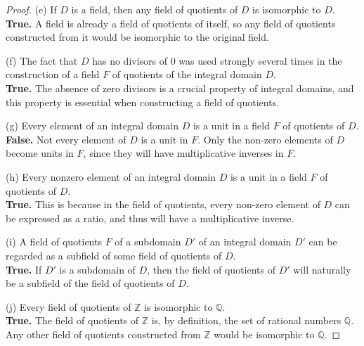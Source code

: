 \documentclass[12pt]{amsart}
\theoremstyle{definition}
\numberwithin{equation}{section}
\theoremstyle{plain}
\newcommand{\Z}{\mathbb{Z}}
\newcommand{\Q}{\mathbb{Q}}
\begin{document}
\begin{exercise}{4}
\begin{proof}
(e) If \(D\) is a field, then any field of quotients of \(D\) is isomorphic to \(D\). \\
\textbf{True.} A field is already a field of quotients of itself, so any field of quotients constructed from it would be isomorphic to the original field.

(f) The fact that \(D\) has no divisors of 0 was used strongly several times in the construction of a field \(F\) of quotients of the integral domain \(D\). \\
\textbf{True.} The absence of zero divisors is a crucial property of integral domains, and this property is essential when constructing a field of quotients.

(g) Every element of an integral domain \(D\) is a unit in a field \(F\) of quotients of \(D\). \\
\textbf{False.} Not every element of \(D\) is a unit in \(F\). Only the non-zero elements of \(D\) become units in \(F\), since they will have multiplicative inverses in \(F\).

(h) Every nonzero element of an integral domain \(D\) is a unit in a field \(F\) of quotients of \(D\). \\
\textbf{True.} This is because in the field of quotients, every non-zero element of \(D\) can be expressed as a ratio, and thus will have a multiplicative inverse.

(i) A field of quotients \(F\) of a subdomain \(D'\) of an integral domain \(D'\) can be regarded as a subfield of some field of quotients of \(D\). \\
\textbf{True.} If \(D'\) is a subdomain of \(D\), then the field of quotients of \(D'\) will naturally be a subfield of the field of quotients of \(D\).

(j) Every field of quotients of \(\Z\) is isomorphic to \(\Q\). \\
\textbf{True.} The field of quotients of \(\Z\) is, by definition, the set of rational numbers \(\Q\). Any other field of quotients constructed from \(\Z\) would be isomorphic to \(\Q\).

\end{proof}
\end{exercise}
\end{document}
